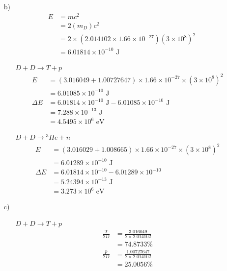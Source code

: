 \documentclass{article}
\begin{document}
\begin{itemize}
\begin{itemize}
        \item [b)]
        \begin{align*}
            E&=mc^2\\
            &=2(m_{D})c^2\\
            &=2\times (2.014102\times 1.66\times 10^{-27}) (3\times 10^8)^2\\
            &=6.01814\times 10^{-10} \text{ J}
        \end{align*}
        \begin{itemize}
            \item [\(D+D\rightarrow T+p\)]
            \begin{align*}
                E &=(3.016049+1.00727647)\times 1.66\times 10^{-27}\times (3\times 10^8)^2\\
                &=6.01085\times 10^{-10} \text{ J}\\
                \Delta E &=6.01814\times 10^{-10} \text{ J}-6.01085\times 10^{-10} \text{ J}\\
                &=7.288\times 10^{-13} \text{ J}\\
                &=4.5495\times 10^6 \text{ eV}
            \end{align*}
            \item [\(D+D\rightarrow {}^3He + n\)]
            \begin{align*}
                E &=(3.016029+1.008665)\times 1.66\times 10^{-27}\times (3\times 10^8)^2\\
                &=6.01289\times 10^{-10} \text{ J}\\
                \Delta E &= 6.01814\times 10^{-10} - 6.01289\times 10^{-10}\\
                &=5.24394\times 10^{-13} \text{ J}\\
                &=3.273 \times 10^6 \text{ eV}
            \end{align*}
        \end{itemize}
        \item [c)]\ 
        \begin{itemize}
            \item [\(D+D\rightarrow T+p\)]
            \begin{align*}
                \frac{T}{2D} &= \frac{3.016049}{2\times 2.014102}\\
                &=74.8733 \%\\
                \frac{p}{2D} &= \frac{1.00727647}{2\times 2.014102}\\
                &=25.0056 \%

\end{align*}
\end{itemize}
\end{itemize}
\end{itemize}
\end{document}
